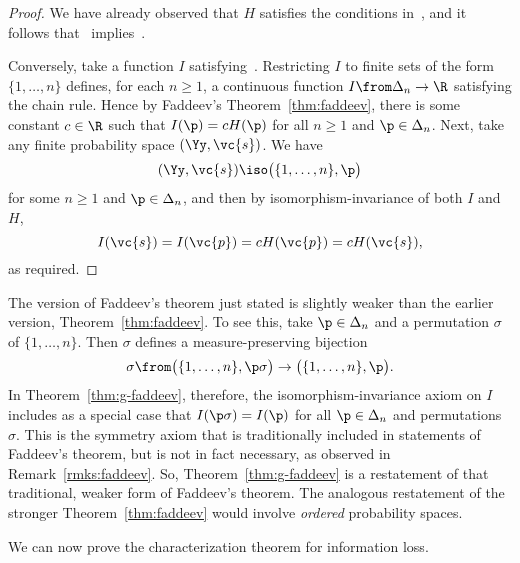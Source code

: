 \begin{proof}
% 
We have already observed that $H$ satisfies the conditions
in~, and it follows
that~ implies~.

Conversely, take a function $I$ satisfying~.
Restricting $I$ to finite sets of the form $\{1, \ldots, n\}$ defines, for
each $n \geq 1$, a continuous function $I \from \Delta_n \to \R$ satisfying
the chain rule.  Hence by Faddeev's Theorem~\ref{thm:faddeev}, there is
some constant $c \in \R$ such that $I(\p) = cH(\p)$ for all $n \geq 1$ and
$\p \in \Delta_n$.  Next, take any finite probability space $(\Yy,
\vc{s})$.  We have
\[
(\Yy, \vc{s}) 
\iso
\bigl( \{1, \ldots, n\}, \p \bigr)
\]
for some $n \geq 1$ and $\p \in \Delta_n$, and then by
isomorphism-invariance of both $I$ and $H$,
\[
I(\vc{s})
=
I(\vc{p})
=
cH(\vc{p})
=
cH(\vc{s}),
\]
as required.
\end{proof}

\begin{remark}
The version of Faddeev's theorem just stated is slightly weaker than the
earlier version, Theorem~\ref{thm:faddeev}.  To see this, take $\p \in
\Delta_n$ and a permutation $\sigma$ of $\{1, \ldots, n\}$.  Then $\sigma$
defines a measure-preserving bijection 
\[
\sigma \from
\bigl( \{1, \ldots, n\}, \p\sigma \bigr) 
\to
\bigl( \{1, \ldots, n\}, \p \bigr).
\]
In Theorem~\ref{thm:g-faddeev}, therefore, the isomorphism-invariance axiom
on $I$ includes as a special case that $I(\p\sigma) = I(\p)$ for all $\p
\in \Delta_n$ and permutations $\sigma$.  This is the symmetry%
%
%
% 
axiom that is traditionally included in statements of Faddeev's theorem,
but is not in fact necessary, as observed in
Remark~\ref{rmks:faddeev}.  So,
Theorem~\ref{thm:g-faddeev} is a restatement of that traditional, weaker
form of Faddeev's theorem.  The analogous restatement of the stronger
Theorem~\ref{thm:faddeev} would involve \emph{ordered}%
%
%
%
probability spaces.
\end{remark}

We can now prove the characterization theorem for information loss.

